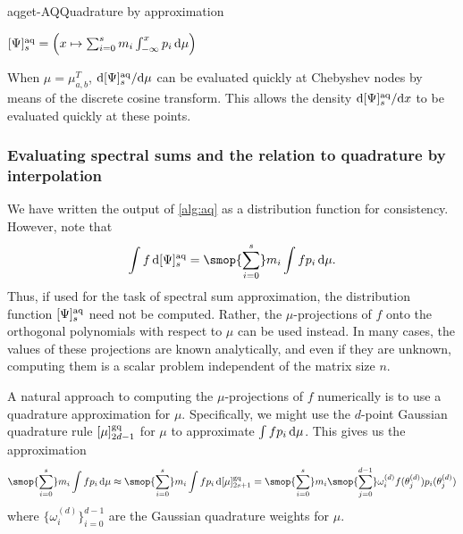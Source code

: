 \begin{labelalgorithm}[H]{aq}{get-AQ}{Quadrature by approximation}
\begin{algorithmic}[1]
    \State \Return \( \qq[a]{\Psi}{s} = \left( x \mapsto \sum_{i=0}^{s} m_i \int_{-\infty}^{x} p_i \,\d\mu \right) \)
\EndProcedure
\end{algorithmic}
\end{labelalgorithm}

\begin{remark}
    When \( \mu = \mu_{a,b}^T \), \( {\d\qq[a]{\Psi}{s}} / {\d\mu} \) can be evaluated quickly at Chebyshev nodes by means of the discrete cosine transform.
    This allows the density \( {\d\qq[a]{\Psi}{s}} / {\d{x}} \) to be evaluated quickly at these points.
\end{remark}


\subsubsection{Evaluating spectral sums and the relation to quadrature by interpolation}

We have written the output of \cref{alg:aq} as a distribution function for consistency.
However, note that 
\begin{equation*}
    \int f \,\d \qq[a]{\Psi}{s}
    = \smop{\sum_{i=0}^{s}} m_i \int f  p_i \,\d\mu.
\end{equation*}
Thus, if used for the task of spectral sum approximation, the distribution function \( \qq[a]{\Psi}{s} \) need not be computed. 
Rather, the \( \mu \)-projections of \( f \) onto the orthogonal polynomials with respect to \( \mu \) can be used instead.
In many cases, the values of these projections are known analytically, and even if they are unknown, computing them is a scalar problem independent of the matrix size \( n \).


A natural approach to computing the \( \mu \)-projections of \( f \) numerically is to use a quadrature approximation for \( \mu \).
Specifically, we might use the \( d \)-point Gaussian quadrature rule \( \qq[g]{\mu}{2d-1} \) for \( \mu \) to approximate \( \int f p_i \,\textup{d}\mu \).
This gives us the approximation 
\begin{equation*}
    \smop{\sum_{i=0}^{s}} m_i \int f p_i \,\d\mu
    \approx \smop{\sum_{i=0}^{s}}  m_i \int f p_i \,\d \qq[g]{\mu}{2s+1}
    = \smop{\sum_{i=0}^{s}}  m_i \smop{\sum_{j=0}^{d-1}} \omega_{i}^{(d)} f(\theta_{j}^{(d)}) p_i(\theta_j^{(d)})
\end{equation*}
where \( \{ \omega_i^{(d)} \}_{i=0}^{d-1} \) are the Gaussian quadrature weights for \( \mu \).

